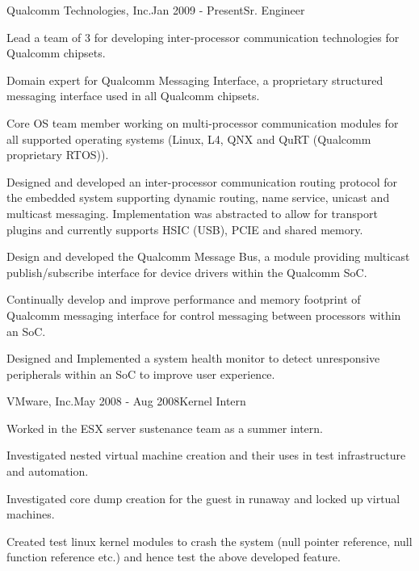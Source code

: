 \begin{rSubsection}{Qualcomm Technologies, Inc.}{Jan 2009 - Present}{Sr. Engineer}{}
  \item Lead a team of 3 for developing inter-processor communication technologies for Qualcomm chipsets.
  \item Domain expert for Qualcomm Messaging Interface, a proprietary structured messaging interface used in all Qualcomm chipsets.
  \item Core OS team member working on multi-processor communication modules for all supported operating systems (Linux, L4, QNX and QuRT (Qualcomm proprietary RTOS)).
  \item Designed and developed an inter-processor communication routing protocol for the embedded system supporting dynamic routing, name service, unicast and multicast messaging. Implementation was abstracted to allow for transport plugins and currently supports HSIC (USB), PCIE and shared memory.
  \item Design and developed the Qualcomm Message Bus, a module providing multicast publish/subscribe interface for device drivers within the Qualcomm SoC. 
  \item Continually develop and improve performance and memory footprint of Qualcomm messaging interface for control messaging between processors within an SoC.
  \item Designed and Implemented a system health monitor to detect unresponsive peripherals within an SoC to improve user experience.
\end{rSubsection}


\begin{rSubsection}{VMware, Inc.}{May 2008 - Aug 2008}{Kernel Intern}{}
  \item Worked in the ESX server sustenance team as a summer intern.
  \item Investigated nested virtual machine creation and their uses in test infrastructure and automation.
  \item Investigated core dump creation for the guest in runaway and locked up virtual machines.
  \item Created test linux kernel modules to crash the system (null pointer reference, null function reference etc.) and hence test the above developed feature.
\end{rSubsection}


